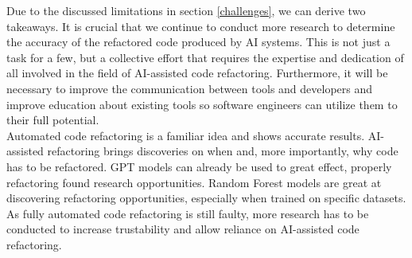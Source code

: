 Due to the discussed limitations in section \ref{challenges}, we can derive two takeaways.
It is crucial that we continue to conduct more research to determine the accuracy of the refactored code produced by AI systems. This is not just a task for a few, but a collective effort that requires the expertise and dedication of all involved in the field of AI-assisted code refactoring.
Furthermore, it will be necessary to improve the communication between tools and developers and improve education about existing tools so software engineers can utilize them to their full potential.\\
Automated code refactoring is a familiar idea and shows accurate results. AI-assisted refactoring brings discoveries on when and, more importantly, why code has to be refactored. GPT models can already be used to great effect, properly refactoring found research opportunities. Random Forest models are great at discovering refactoring opportunities, especially when trained on specific datasets. As fully automated code refactoring is still faulty, more research has to be conducted to increase trustability and allow reliance on AI-assisted code refactoring.